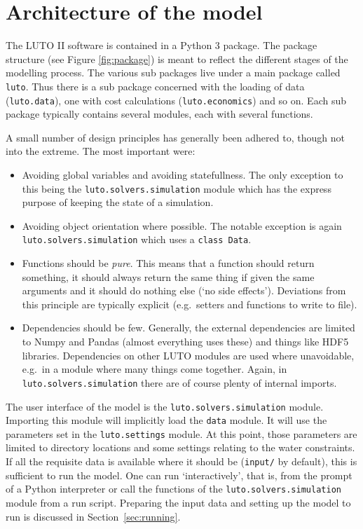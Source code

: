 \documentclass[12pt,a4paper,twoside]{article}
\begin{document}
\section{Architecture of the model}
The LUTO II software is contained in a Python 3 package. The package structure (see Figure \ref{fig:package}) is meant to reflect the different stages of the modelling process. The various sub packages live under a main package called \texttt{luto}. Thus there is a sub package concerned with the loading of data (\texttt{luto.data}), one with cost calculations (\texttt{luto.economics}) and so on. Each sub package typically contains several modules, each with several functions.

A small number of design principles has generally been adhered to, though not into the extreme. The most important were:
\begin{itemize}
	\item Avoiding global variables and avoiding statefullness. The only exception to this being the \texttt{luto.solvers.simulation} module which has the express purpose of keeping the state of a simulation.
	\item Avoiding object orientation where possible. The notable exception is again \texttt{luto.solvers.simulation} which uses a \texttt{class Data}.
	\item Functions should be \emph{pure}. This means that a function should return something, it should always return the same thing if given the same arguments and it should do nothing else (`no side effects'). Deviations from this principle are typically explicit (e.g.\ setters and functions to write to file).
	\item Dependencies should be few. Generally, the external dependencies are limited to Numpy and Pandas (almost everything uses these) and things like HDF5 libraries. Dependencies on other LUTO modules are used where unavoidable, e.g.\ in a module where many things come together. Again, in \texttt{luto.solvers.simulation} there are of course plenty of internal imports.
\end{itemize}

The user interface of the model is the \texttt{luto.solvers.simulation} module. Importing this module will implicitly load the \texttt{data} module. It will use the parameters set in the \texttt{luto.settings} module. At this point, those parameters are limited to directory locations and some settings relating to the water constraints. If all the requisite data is available where it should be (\texttt{input/} by default), this is sufficient to run the model. One can run `interactively', that is, from the prompt of a Python interpreter or call the functions of the \texttt{luto.solvers.simulation} module from a run script. Preparing the input data and setting up the model to run is discussed in Section~\ref{sec:running}.
\end{document}
